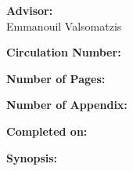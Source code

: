 \begin{titlepage}
\begin{minipage}{0.4\textwidth}
\begin{description}
			\item {\bf Advisor:}\\
			Emmanouil Valsomatzis\\

			\item {\bf Circulation Number:} \rprints
			\item {\bf Number of Pages:} \rlastpage
			\item {\bf Number of Appendix:} \rappendices
			\item {\bf Completed on:} \rdeadline
		\end{description}
	\end{minipage}
	\hfill
	\begin{minipage}{0.4\textwidth}
		\textbf{Synopsis:}\bigskip\bigskip
		\vfill
		\fbox{
		\begin{minipage}{\textwidth}
			\vspace{5pt}
			\small 
			\vspace{5pt}
		\end{minipage}}
	\end{minipage}
	\newline\newline\newline
\end{titlepage}
